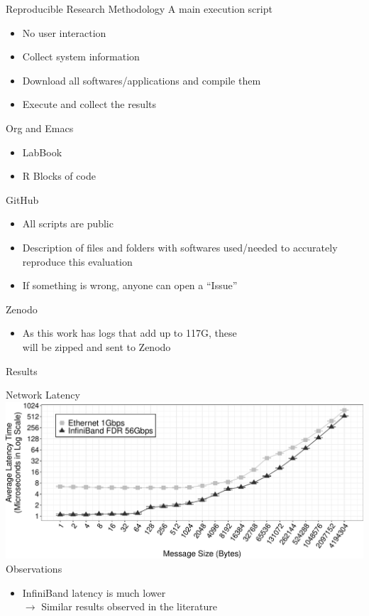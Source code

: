 \documentclass{beamer}
\begin{document}
\begin{frame}{Reproducible Research Methodology}
\vfill
A main execution script
\begin{itemize}
    \item No user interaction
    \item Collect system information
    \item Download all softwares/applications and compile them
    \item Execute and collect the results
\end{itemize}

\pause Org and Emacs
\begin{itemize}
    \item LabBook
    \item R Blocks of code
\end{itemize}

\pause GitHub
\begin{itemize}
    \item All scripts are public
    \item Description of files and folders with softwares used/needed to accurately reproduce this evaluation
    \item If something is wrong, anyone can open a ``Issue''
\end{itemize}

\pause Zenodo
\begin{itemize}
    \item As this work has logs that add up to 117G, these \\will be zipped and sent to Zenodo
\end{itemize}
\end{frame}


\begin{frame} 
\begin{block}{}
\begin{center}
\Huge{Results}
\end{center}
\end{block}
\end{frame}

\begin{frame}{Network Latency}
\includegraphics[width=\textwidth]{SLIDES/img/Latency.pdf}
\vfill\pause
\pause Observations
\begin{itemize}
    \item InfiniBand latency is much lower\\
        $\to$ Similar results observed in the literature
\end{itemize}
\end{frame}
\end{document}
